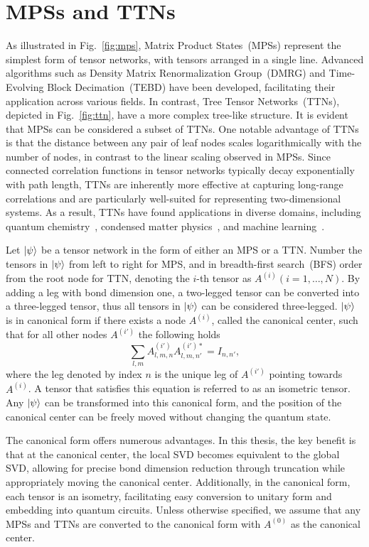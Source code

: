 \documentclass[12pt,dvipdfmx,twoside,openright]{report}
\begin{document}
\section{MPSs and TTNs}
As illustrated in Fig.~\ref{fig:mps}, Matrix Product States~(MPSs) represent the simplest form of tensor networks, with tensors arranged in a single line. 
Advanced algorithms such as Density Matrix Renormalization Group~(DMRG) and Time-Evolving Block Decimation~(TEBD) have been developed, facilitating their application across various fields. 
In contrast, Tree Tensor Networks~(TTNs), depicted in Fig.~\ref{fig:ttn}, have a more complex tree-like structure.
It is evident that MPSs can be considered a subset of TTNs.
One notable advantage of TTNs is that the distance between any pair of leaf nodes scales logarithmically with the number of nodes, in contrast to the linear scaling observed in MPSs. 
Since connected correlation functions in tensor networks typically decay exponentially with path length, TTNs are inherently more effective at capturing long-range correlations and are particularly well-suited for representing two-dimensional systems. 
As a result, TTNs have found applications in diverse domains, including quantum chemistry~\cite{chemical1,chemical2}, condensed matter physics~\cite{condmat1,condmat2,condmat3}, and machine learning~\cite{ml1,ml2}.

Let $\ket{\psi}$ be a tensor network in the form of either an MPS or a TTN.
Number the tensors in $\ket{\psi}$ from left to right for MPS, and in breadth-first search~(BFS) order from the root node for TTN, denoting the $i$-th tensor as $A^{(i)} (i=1,\dots,N)$.
By adding a leg with bond dimension one, a two-legged tensor can be converted into a three-legged tensor, thus all tensors in $\ket{\psi}$ can be considered three-legged.
$\ket{\psi}$ is in canonical form if there exists a node $A^{(i)}$, called the canonical center, such that for all other nodes $A^{(i')}$ the following holds
\begin{equation}
    \sum_{l,m}A^{(i')}_{l,m,n}A^{(i')*}_{l,m,n'}=I_{n,n'},
\end{equation}
where the leg denoted by index $n$ is the unique leg of $A^{(i')}$ pointing towards $A^{(i)}$.
A tensor that satisfies this equation is referred to as an isometric tensor.
Any $\ket{\psi}$ can be transformed into this canonical form, and the position of the canonical center can be freely moved without changing the quantum state.

The canonical form offers numerous advantages.
In this thesis, the key benefit is that at the canonical center, the local SVD becomes equivalent to the global SVD, allowing for precise bond dimension reduction through truncation while appropriately moving the canonical center.
Additionally, in the canonical form, each tensor is an isometry, facilitating easy conversion to unitary form and embedding into quantum circuits. 
Unless otherwise specified, we assume that any MPSs and TTNs are converted to the canonical form with $A^{(0)}$ as the canonical center.
\end{document}
